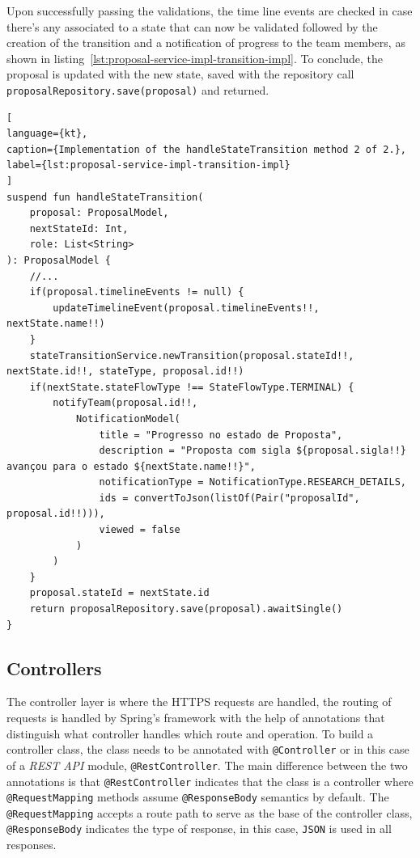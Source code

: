 Upon successfully passing the validations, the time line events are checked in case there's any associated to a state that can now be validated followed by the creation of the transition and a notification of progress to the team members, as shown in listing~\ref{lst:proposal-service-impl-transition-impl}. To conclude, the proposal is updated with the new state, saved with the repository call \lstinline{proposalRepository.save(proposal)} and returned.


\begin{lstlisting}[
language={kt},
caption={Implementation of the handleStateTransition method 2 of 2.},
label={lst:proposal-service-impl-transition-impl}
]
suspend fun handleStateTransition(
    proposal: ProposalModel,
    nextStateId: Int,
    role: List<String>
): ProposalModel {
    //...
    if(proposal.timelineEvents != null) {
        updateTimelineEvent(proposal.timelineEvents!!, nextState.name!!)
    }
    stateTransitionService.newTransition(proposal.stateId!!, nextState.id!!, stateType, proposal.id!!)
    if(nextState.stateFlowType !== StateFlowType.TERMINAL) {
        notifyTeam(proposal.id!!,
            NotificationModel(
                title = "Progresso no estado de Proposta",
                description = "Proposta com sigla ${proposal.sigla!!} avançou para o estado ${nextState.name!!}",
                notificationType = NotificationType.RESEARCH_DETAILS,
                ids = convertToJson(listOf(Pair("proposalId", proposal.id!!))),
                viewed = false
            )
        )
    }
    proposal.stateId = nextState.id
    return proposalRepository.save(proposal).awaitSingle()
}
\end{lstlisting}


\subsection{Controllers}\label{ch:impl:sec:be:subsec:controllers}

The controller layer is where the HTTPS requests are handled, the routing of requests is handled by Spring's framework with the help of annotations that distinguish what controller handles which route and operation.
To build a controller class, the class needs to be annotated with \lstinline{@Controller} or in this case of a \textit{REST API} module, \lstinline{@RestController}. The main difference between the two annotations is that \lstinline{@RestController} indicates that the class is a controller where \lstinline{@RequestMapping} methods assume \lstinline{@ResponseBody} semantics by default.
The \lstinline{@RequestMapping} accepts a route path to serve as the base of the controller class, \lstinline{@ResponseBody} indicates the type of response, in this case, \texttt{JSON} is used in all responses. 


